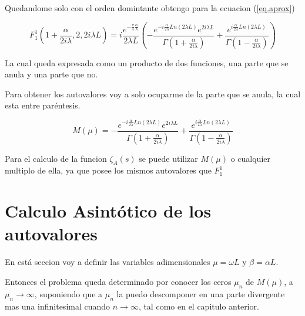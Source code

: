 Quedandome solo con el orden domintante obtengo para la ecuacion (\ref{eq.aprox}) %

\begin{equation}
    F _1 ^1 (1+  \frac{  \alpha}{2 i \lambda} ,2 ,2 i \lambda L  ) = 
   i  \frac{e ^{- \frac{\pi}{4} \frac{\alpha}{\lambda} } }{2 \lambda L}
    \left( -
    \frac{e ^{- i \frac{\alpha}{2 \lambda} Ln(2 \lambda L) } e ^{2 i \lambda L} }{\Gamma(1+\frac{ \alpha}{2 i \lambda})} +
    \frac{e ^{  i \frac{\alpha}{2 \lambda} Ln(2 \lambda L) }}               {\Gamma(1-\frac{ \alpha}{2 i \lambda})}
    \right)
\label{eq.completa}
\end{equation}




La cual queda expresada como un producto de dos funciones, una parte que se anula y una parte que no.

Para obtener los autovalores voy a solo ocuparme de la parte que se anula, la cual esta entre paréntesis.

\begin{equation}
    M (\mu) = 
    - \frac{e ^{- i \frac{\alpha}{2 \lambda} Ln(2 \lambda L) } e ^{2 i \lambda L} }{\Gamma(1+\frac{ \alpha}{2 i \lambda})} +
    \frac{e ^{  i \frac{\alpha}{2 \lambda} Ln(2 \lambda L) }}               {\Gamma(1-\frac{ \alpha}{2 i \lambda})}
\label{eq.aproxx}
\end{equation}

Para el calculo de la funcion $\zeta _A (s) $ se puede utilizar $M ( \mu )$ o cualquier multiplo de ella, ya que posee los mismos autovalores que $F_1 ^1 $




\section{Calculo Asintótico de los autovalores}


En está seccion voy a definir las variables adimensionales $\mu = \omega L $ y $\beta = \alpha L$.

Entonces el problema queda determinado por conocer los ceros $\mu _n$ de $M(\mu)$, a $\mu _n \rightarrow{\infty}$, suponiendo que a $\mu _n$ la puedo descomponer en una parte divergente mas una infinitesimal cuando $n \rightarrow{\infty}$, tal como en el capitulo anterior.


